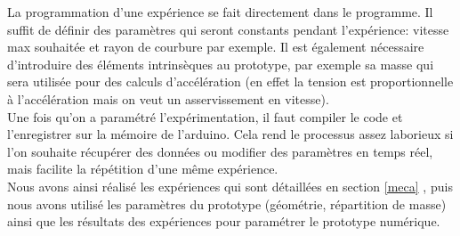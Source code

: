 La programmation d'une expérience se fait directement dans le programme. Il suffit de définir des paramètres qui seront constants pendant l'expérience: vitesse max souhaitée et rayon de courbure par exemple. Il est également nécessaire d'introduire des éléments intrinsèques au prototype, par exemple sa masse qui sera utilisée pour des calculs d'accélération (en effet la tension est proportionnelle à l'accélération mais on veut un asservissement en vitesse).\\
Une fois qu'on a paramétré l'expérimentation, il faut compiler le code et l'enregistrer sur la mémoire de l'arduino. Cela rend le processus assez laborieux si l'on souhaite récupérer des données ou modifier des paramètres en temps réel, mais facilite la répétition d'une même expérience.\\
Nous avons ainsi réalisé les expériences qui sont détaillées en section \ref{meca} , puis nous avons utilisé les paramètres du prototype (géométrie, répartition de masse) ainsi que les résultats des expériences pour paramétrer le prototype numérique.

